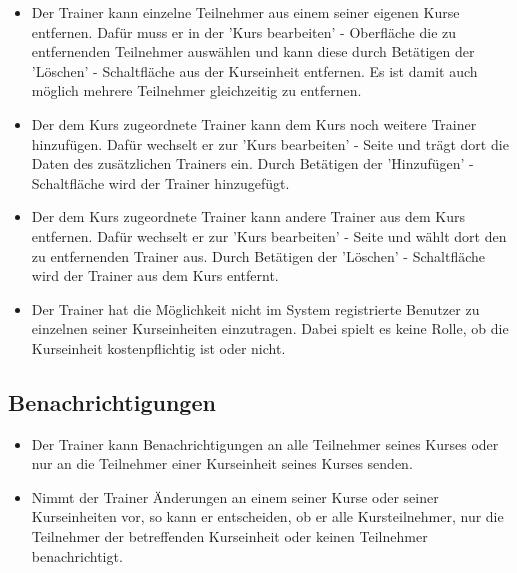 \documentclass[a4paper]{scrreprt}
\begin{document}
\begin{itemize}
	\item {}
	Der Trainer kann einzelne Teilnehmer aus einem seiner eigenen Kurse entfernen. Dafür muss er in der 'Kurs bearbeiten' - Oberfläche die zu entfernenden Teilnehmer auswählen und kann diese durch Betätigen der 'Löschen' - Schaltfläche aus der Kurseinheit entfernen. Es ist damit auch möglich mehrere Teilnehmer gleichzeitig zu entfernen.
	\item {}
	Der dem Kurs zugeordnete Trainer kann dem Kurs noch weitere Trainer hinzufügen. Dafür wechselt er zur 'Kurs bearbeiten' - Seite und trägt dort die Daten des zusätzlichen Trainers ein. Durch Betätigen der 'Hinzufügen' - Schaltfläche wird der Trainer hinzugefügt.
	\item {}
	Der dem Kurs zugeordnete Trainer kann andere Trainer aus dem Kurs entfernen. Dafür wechselt er zur 'Kurs bearbeiten' - Seite und wählt dort den zu entfernenden Trainer aus. Durch Betätigen der 'Löschen' - Schaltfläche wird der Trainer aus dem Kurs entfernt.
	\item {}
	Der Trainer hat die Möglichkeit nicht im System registrierte Benutzer zu einzelnen seiner Kurseinheiten einzutragen. Dabei spielt es keine Rolle, ob die Kurseinheit kostenpflichtig ist oder nicht.
\end{itemize}

\subsection{Benachrichtigungen}
\begin{itemize}
	\item {}
	Der Trainer kann Benachrichtigungen an alle Teilnehmer seines Kurses oder nur an die Teilnehmer einer Kurseinheit seines Kurses senden.
	\item {}	
	Nimmt der Trainer Änderungen an einem seiner Kurse oder seiner Kurseinheiten vor, so kann er entscheiden, ob er alle Kursteilnehmer, nur die Teilnehmer der betreffenden Kurseinheit oder keinen Teilnehmer benachrichtigt.
\end{itemize}
\end{document}
